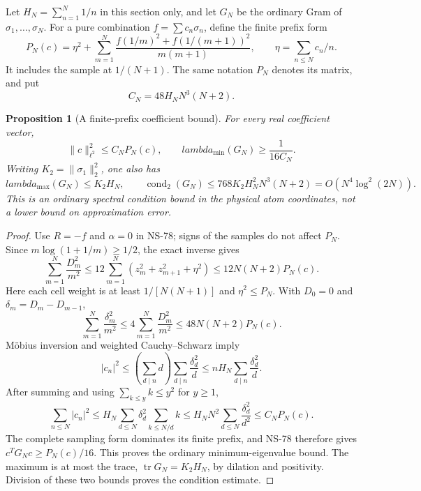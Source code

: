 \documentclass[11pt]{article}
\def\lambda{lambda}%
\newtheorem{proposition}[theorem]{Proposition}
\theoremstyle{remark}
\begin{document}
Let $H_N=\sum_{n=1}^N1/n$ in this section only, and let $G_N$ be the
ordinary Gram of $\sigma_1,\ldots,\sigma_N$. For a pure combination
$f=\sum c_n\sigma_n$, define the finite prefix form
\[
 P_N(c)=\eta^2+\sum_{m=1}^N\frac{f(1/m)^2+f(1/(m+1))^2}{m(m+1)},
 \qquad \eta=\sum_{n\leq N}c_n/n.
\]
It includes the sample at $1/(N+1)$. The same notation $P_N$ denotes
its matrix, and put
\[
 C_N=48H_NN^3(N+2).
\]

\begin{proposition}[A finite-prefix coefficient bound]
\label{prop:ns81-conditioning}
For every real coefficient vector,
\begin{equation}
 \|c\|_{\ell^2}^2\leq C_N P_N(c),\qquad
 \lambda_{\min}(G_N)\geq\frac1{16C_N}.
 \label{eq:ns81-conditioning}
\end{equation}
Writing $K_2=\|\sigma_1\|_2^2$, one also has
\[
 \lambda_{\max}(G_N)\leq K_2H_N,\qquad
 \operatorname{cond}_2(G_N)\leq768K_2H_N^2N^3(N+2)
                         =O(N^4\log^2(2N)).
\]
This is an ordinary spectral condition bound in the physical atom
coordinates, not a lower bound on approximation error.
\end{proposition}
\begin{proof}
Use $R=-f$ and $\alpha=0$ in NS-78; signs of the samples do not affect
$P_N$. Since $m\log(1+1/m)\geq1/2$, the exact inverse gives
\[
 \sum_{m=1}^N\frac{D_m^2}{m^2}
 \leq12\sum_{m=1}^N(z_m^2+z_{m+1}^2+\eta^2)
 \leq12N(N+2)P_N(c).
\]
Here each cell weight is at least $1/[N(N+1)]$ and $\eta^2\leq P_N$.
With $D_0=0$ and $\delta_m=D_m-D_{m-1}$,
\[
 \sum_{m=1}^N\frac{\delta_m^2}{m^2}
 \leq4\sum_{m=1}^N\frac{D_m^2}{m^2}
 \leq48N(N+2)P_N(c).
\]
M\"obius inversion and weighted Cauchy--Schwarz imply
\[
 |c_n|^2\leq\left(\sum_{d\mid n}d\right)
                  \sum_{d\mid n}\frac{\delta_d^2}{d}
 \leq nH_N\sum_{d\mid n}\frac{\delta_d^2}{d}.
\]
After summing and using $\sum_{k\leq y}k\leq y^2$ for $y\geq1$,
\[
 \sum_{n\leq N}|c_n|^2
 \leq H_N\sum_{d\leq N}\delta_d^2\sum_{k\leq N/d}k
 \leq H_NN^2\sum_{d\leq N}\frac{\delta_d^2}{d^2}
 \leq C_NP_N(c).
\]
The complete sampling form dominates its finite prefix, and NS-78
therefore gives $c^TG_Nc\geq P_N(c)/16$. This proves the ordinary
minimum-eigenvalue bound. The maximum is at most the trace,
$\operatorname{tr}G_N=K_2H_N$, by dilation and positivity. Division
of these two bounds proves the condition estimate.
\end{proof}
\end{document}
